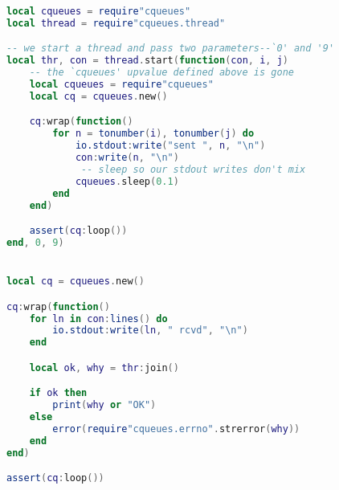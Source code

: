 \documentclass[11pt, oneside]{memoir}
\begin{document}
\begin{lstlisting}[language=lua]
local cqueues = require"cqueues"
local thread = require"cqueues.thread"

-- we start a thread and pass two parameters--`0' and '9'
local thr, con = thread.start(function(con, i, j)
	-- the `cqueues' upvalue defined above is gone
	local cqueues = require"cqueues"
	local cq = cqueues.new()

	cq:wrap(function()
		for n = tonumber(i), tonumber(j) do
			io.stdout:write("sent ", n, "\n")
			con:write(n, "\n")
			 -- sleep so our stdout writes don't mix
			cqueues.sleep(0.1)
		end
	end)

	assert(cq:loop())
end, 0, 9)


local cq = cqueues.new()

cq:wrap(function()
	for ln in con:lines() do
		io.stdout:write(ln, " rcvd", "\n")
	end

	local ok, why = thr:join()

	if ok then
		print(why or "OK")
	else
		error(require"cqueues.errno".strerror(why))
	end
end)

assert(cq:loop())
\end{lstlisting}



\appendix
\printindex
\end{document}
